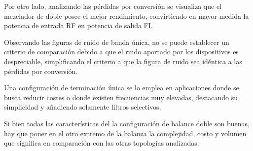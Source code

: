 \documentclass[twocolumn]{article}
\begin{document}
Por otro lado, analizando las pérdidas por conversión se visualiza que el mezclador de doble posee el mejor rendimiento, convirtiendo en mayor medida la potencia de entrada RF en potencia de salida FI. 

Observando las figuras de ruido de banda única, no se puede establecer un criterio de comparación debido a que el ruido aportado por los dispositivos es despreciable, simplificando el criterio a que la figura de ruido sea idéntica a las pérdidas por conversión. 

 Una configuración de terminación única se lo emplea en aplicaciones donde se busca reducir costes o donde existen frecuencias muy elevadas, destacando su simplicidad y añadiendo solamente filtros selectivos.
 
 Si bien todas las características del la configuración de balance doble son buenas, hay que poner en el otro extremo de la balanza la complejidad, costo y volumen que significa en comparación con las otras topologías analizadas.
\end{document}
